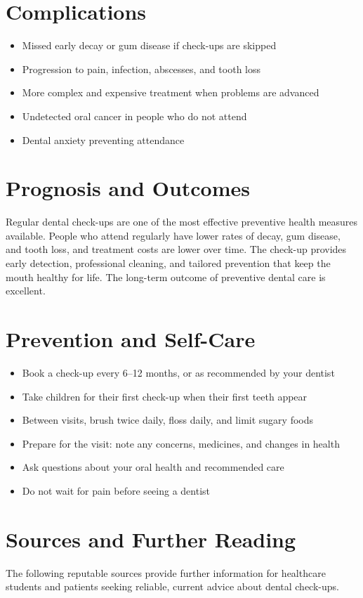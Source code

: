 \section*{Complications}
\begin{itemize}
    \item Missed early decay or gum disease if check-ups are skipped
    \item Progression to pain, infection, abscesses, and tooth loss
    \item More complex and expensive treatment when problems are advanced
    \item Undetected oral cancer in people who do not attend
    \item Dental anxiety preventing attendance
\end{itemize}

\section*{Prognosis and Outcomes}
Regular dental check-ups are one of the most effective preventive health measures available. People who attend regularly have lower rates of decay, gum disease, and tooth loss, and treatment costs are lower over time. The check-up provides early detection, professional cleaning, and tailored prevention that keep the mouth healthy for life. The long-term outcome of preventive dental care is excellent.

\section*{Prevention and Self-Care}
\begin{itemize}
    \item Book a check-up every 6--12 months, or as recommended by your dentist
    \item Take children for their first check-up when their first teeth appear
    \item Between visits, brush twice daily, floss daily, and limit sugary foods
    \item Prepare for the visit: note any concerns, medicines, and changes in health
    \item Ask questions about your oral health and recommended care
    \item Do not wait for pain before seeing a dentist
\end{itemize}

\section*{Sources and Further Reading}
The following reputable sources provide further information for healthcare students and patients seeking reliable, current advice about dental check-ups.

